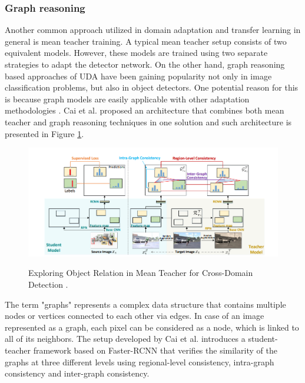 \subsubsection{Graph reasoning}
\label{graph_reasoning} 
Another common approach utilized in domain adaptation and transfer learning in general is mean teacher training. A typical mean teacher setup consists of two equivalent models. However, these models are trained using two separate strategies to adapt the detector network. On the other hand, graph reasoning based approaches of UDA have been gaining popularity not only in image classification problems, but also in object detectors. One potential reason for this is because graph models are easily applicable with other adaptation methodologies \cite{Oza2021}. Cai et al. \cite{Cai2019} proposed an architecture that combines both mean teacher and graph reasoning techniques in one solution and such architecture is presented in Figure \ref{graph_MT}. 
 
\begin{figure}[htb]
	\begin{center}
		\includegraphics[width=16cm]{./graph_teacher.png}
	\end{center}
	\caption{Exploring Object Relation in Mean Teacher for Cross-Domain Detection \cite{Cai2019}.}
	\begin{center}
		\label{graph_MT}
	\end{center}
\end{figure}

The term "graphs" represents a complex data structure that contains multiple nodes or vertices connected to each other via edges. In case of an image represented as a graph, each pixel can be considered as a node, which is linked to all of its neighbors. 
The setup developed by Cai et al. \cite{Cai2019} introduces a student-teacher framework based on Faster-RCNN that verifies the similarity of the graphs at three different levels using regional-level consistency, intra-graph consistency and inter-graph consistency. 

